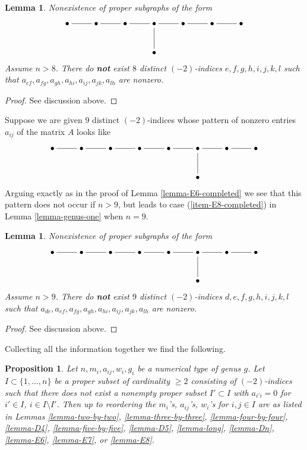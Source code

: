 \documentclass{stacks-project}
\theoremstyle{plain}
\newtheorem{proposition}[subsection]{Proposition}
\newtheorem{lemma}[subsection]{Lemma}
\theoremstyle{definition}
\theoremstyle{remark}
\numberwithin{equation}{subsection}
\begin{document}
\begin{lemma}
\label{lemma-E7-completed}
Nonexistence of proper subgraphs of the form
$$
\xymatrix{
\bullet \ar@{-}[r] &
\bullet \ar@{-}[r] &
\bullet \ar@{-}[r] & \bullet \ar@{-}[r] \ar@{-}[d] &
\bullet \ar@{-}[r] & \bullet \ar@{-}[r] & \bullet \\
& & & \bullet
}
$$
Assume $n > 8$. There do {\bf not} exist $8$ distinct
$(-2)$-indices $e, f, g, h, i, j, k, l$
such that $a_{ef}, a_{fg}, a_{gh}, a_{hi}, a_{ij}, a_{jk}, a_{lh}$
are nonzero.
\end{lemma}

\begin{proof}
See discussion above.
\end{proof}

\noindent
Suppose we are given $9$ distinct $(-2)$-indices whose pattern
of nonzero entries $a_{ij}$ of the matrix $A$ looks like
$$
\xymatrix{
\bullet \ar@{-}[r] & \bullet \ar@{-}[r] &
\bullet \ar@{-}[r] & \bullet \ar@{-}[r] &
\bullet \ar@{-}[r] & \bullet \ar@{-}[r] \ar@{-}[d] &
\bullet \ar@{-}[r] & \bullet \\
& & & & & \bullet
}
$$
Arguing exactly as in the proof of Lemma \ref{lemma-E6-completed}
we see that this pattern does not occur if
$n > 9$, but leads to case (\ref{item-E8-completed})
in Lemma \ref{lemma-genus-one} when $n = 9$.

\begin{lemma}
\label{lemma-E8-completed}
Nonexistence of proper subgraphs of the form
$$
\xymatrix{
\bullet \ar@{-}[r] & \bullet \ar@{-}[r] &
\bullet \ar@{-}[r] & \bullet \ar@{-}[r] &
\bullet \ar@{-}[r] & \bullet \ar@{-}[r] \ar@{-}[d] &
\bullet \ar@{-}[r] & \bullet \\
& & & & & \bullet
}
$$
Assume $n > 9$. There do {\bf not} exist $9$ distinct
$(-2)$-indices $d, e, f, g, h, i, j, k, l$
such that $a_{de}, a_{ef}, a_{fg}, a_{gh}, a_{hi}, a_{ij}, a_{jk}, a_{lh}$
are nonzero.
\end{lemma}

\begin{proof}
See discussion above.
\end{proof}

\noindent
Collecting all the information together we find the following.

\begin{proposition}
\label{proposition-classify-subgraphs}
Let $n, m_i, a_{ij}, w_i, g_i$ be a numerical type of genus $g$.
Let $I \subset \{1, \ldots, n\}$ be a proper subset of cardinality $\geq 2$
consisting of $(-2)$-indices such that there
does not exist a nonempty proper subset $I' \subset I$
with $a_{i'i} = 0$ for $i' \in I$, $i \in I \setminus I'$.
Then up to reordering the $m_i$'s, $a_{ij}$'s, $w_i$'s
for $i, j \in I$ are as listed in
Lemmas \ref{lemma-two-by-two},
\ref{lemma-three-by-three},
\ref{lemma-four-by-four},
\ref{lemma-D4},
\ref{lemma-five-by-five},
\ref{lemma-D5},
\ref{lemma-long},
\ref{lemma-Dn},
\ref{lemma-E6},
\ref{lemma-E7}, or
\ref{lemma-E8}.
\end{proposition}
\end{document}
